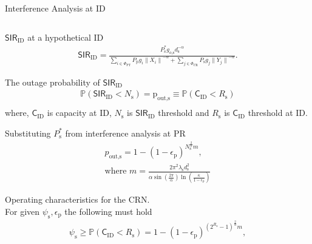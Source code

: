 \documentclass[12pt]{beamer}
\newcommand{\p}{\mathbb P}
\newcommand{\fs}[1]{\fontsize{ #1 pt}{8.2}\selectfont}
\newcommand{\sub}[1]{_{\text{#1}}}
\begin{document}
\begin{frame}[t]{Interference Analysis at ID}
\vspace{-0.2cm}
\begin{columns}
        \begin{column}{0.55\paperwidth}
        \begin{overlayarea}{\textwidth}{7.4cm}
	\begin{itemize}
	\fs{8}
	\item $\mathsf{SIR}\sub{ID}$ at a hypothetical ID
	\begin{align*}
		\mathsf{SIR}\sub{ID} = \frac{P\sub{s}^{*} g\sub{$o$,s} d\sub{s}^{-\alpha}}{\sum\limits_{i \in \Phi_{\text{PT}}} P\sub{p} g_i {\|X_i\|}^{-\alpha} +  \sum\limits_{j \in \Phi_{\text{CR}}} P\sub{s} g_j {\|Y_j\|}^{-\alpha}}. 
	\end{align*}
	\item The outage probability of $\mathsf{SIR}_{\text{ID}}$  
	\begin{align*}
		\mathbb{P}(\textsf{SIR}\sub{ID} < N\sub{s}) = \text{p}\sub{out,s} \equiv \mathbb{P}(\textsf{C}\sub{ID} < R\sub{s}) \\ 
	\end{align*}
	where, $\textsf{C}\sub{ID}$ is capacity at ID, $N\sub{s}$ is $\textsf{SIR}\sub{ID}$ threshold and $R\sub{s}$ is $\textsf{C}\sub{ID}$ threshold at ID.
	\only<2>
	{
		\item Substituting $P\sub{s}^{*}$ from interference analysis at PR 
		\begin{align*}
			p\sub{out,s} = 1 - \left(1 - \epsilon{\sub{p}}\right)^{N\sub{s}^{\frac{2}{\alpha}} m}, \\
\text{where $m = \frac{2 \pi^2 \lambda\sub{s}d\sub{s}^2}{ \alpha \sin\left( \frac{2\pi}{\alpha} \right) \ln \left( \frac{\kappa}{1 - \epsilon\sub{p}} \right) }$}
			\label{eq:SIROutID}
		\end{align*}
	}
	{
		\item Operating characteristics for the CRN. \\
For given $\psi\sub{s}, \epsilon\sub{p}$ the following must hold 
		\begin{align*}
			\psi\sub{s} \ge \p(\mathsf{C}_{\text{ID}} < R\sub{s}) = 1 - \left(1 - \epsilon{\sub{p}}\right)^{ \left( 2^{R\sub{s}}-1 \right)^{\frac{2}{\alpha}} m }, 
			\label{eq:OC} 
		\end{align*}
	}
	

\end{itemize}
\end{overlayarea}
\end{column}
\end{columns}
\end{frame}
\end{document}
